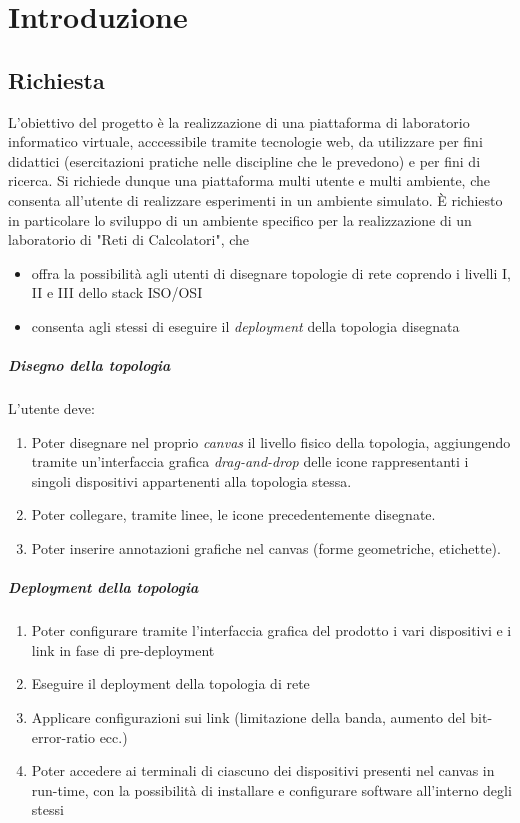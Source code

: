 \documentclass[../main.tex]{subfiles}
\begin{document}
\chapter{Introduzione}
\section{Richiesta}
L'obiettivo del progetto è la realizzazione di una piattaforma di laboratorio informatico virtuale, acccessibile tramite tecnologie web, da utilizzare per fini didattici (esercitazioni pratiche nelle discipline che le prevedono) e per fini di ricerca.
Si richiede dunque una piattaforma multi utente e multi ambiente, che consenta all'utente di realizzare esperimenti in un ambiente simulato.
È richiesto in particolare lo sviluppo di un ambiente specifico per la realizzazione di un laboratorio di "Reti di Calcolatori", che
\begin{itemize}
    \item offra la possibilità agli utenti di disegnare topologie di rete coprendo i livelli I, II e III dello stack ISO/OSI
    \item consenta agli stessi di eseguire il \textit{deployment} della topologia disegnata
\end{itemize}

\paragraph{Disegno della topologia}
L'utente deve:
\begin{enumerate}
    \item Poter disegnare nel proprio \textit{canvas} il livello fisico della topologia, aggiungendo tramite un'interfaccia grafica \textit{drag-and-drop} delle icone rappresentanti i singoli dispositivi appartenenti alla topologia stessa.
    \item Poter collegare, tramite linee, le icone precedentemente disegnate. 
    \item Poter inserire annotazioni grafiche nel canvas (forme geometriche, etichette).
\end{enumerate}
\paragraph{Deployment della topologia}
\begin{enumerate}
    \item Poter configurare tramite l'interfaccia grafica del prodotto i vari dispositivi e i link in fase di pre-deployment
    \item Eseguire il deployment della topologia di rete
    \item Applicare configurazioni sui link (limitazione della banda, aumento del bit-error-ratio ecc.)
    \item Poter accedere ai terminali di ciascuno dei dispositivi presenti nel canvas in run-time, con la possibilità di installare e configurare software all'interno degli stessi

\end{enumerate}
\end{document}
